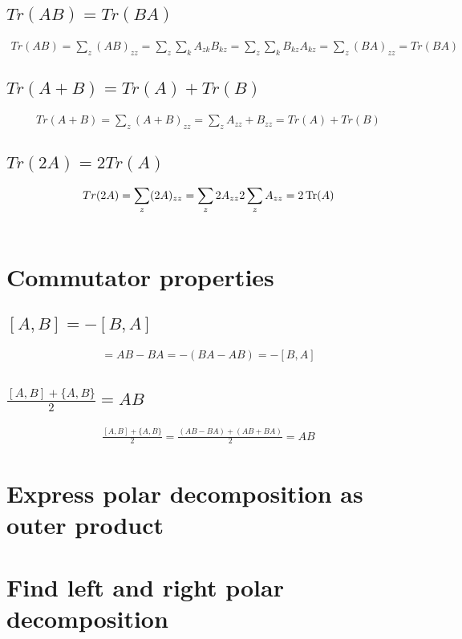 \documentclass[11pt]{book}
\begin{document}
\subsection{$Tr(AB) = Tr(BA)$}
\begin{align*}
    Tr(AB) = \sum_z (AB)_{zz} = \sum_z \sum_k A_{zk} B_{kz} = \sum_z \sum_k B_{kz} A_{kz} = \sum_z (BA)_{zz} = Tr(BA)
\end{align*}

\subsection{$Tr(A + B) = Tr(A) + Tr(B)$}
\begin{align*}
    Tr(A + B) = \sum_z (A + B)_{zz} = \sum_z A_{zz} + B_{zz} = Tr(A) + Tr(B)
\end{align*}


\subsection{$Tr(2A) = 2Tr(A)$}
\begin{align*}
    Tr(2A) = \sum_z (2A)_{zz} = \sum_z 2 A_{zz} 2 \sum_z A_{zz} = 2 \Tr(A)
\end{align*}

\begin{align*}
\end{align*}

\section{Commutator properties}
\subsection{$[A, B] = -[B, A]$}
\begin{align*}
    [A, B] = AB - BA = - (BA - AB) = - [B, A]
\end{align*}

\subsection{$\frac{[A, B] + \{A, B\}}{2} = AB$}
\begin{align*}
    \frac{[A, B] + \{A, B\}}{2} = \frac{(AB - BA) + (AB + BA)}{2} = AB
\end{align*}

\section{Express polar decomposition as outer product}
\section{Find left and right polar decomposition}
\end{document}
